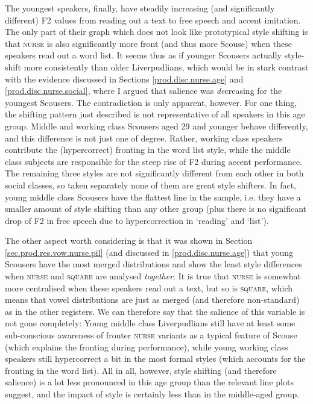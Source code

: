 The youngest speakers, finally, have steadily increasing (and significantly different) F2 values from reading out a text to free speech and accent imitation.
The only part of their graph which does not look like prototypical style shifting is that \textsc{nurse} is also significantly more front (and thus more Scouse) when these speakers read out a word list.
It seems thus as if younger Scousers actually style-shift more consistently than older Liverpudlians, which would be in stark contrast with the evidence discussed in Sections \ref{prod.disc.nurse.age} and \ref{prod.disc.nurse.social}, where I argued that salience was \emph{de}creasing for the youngest Scousers.
The contradiction is only apparent, however.
For one thing, the shifting pattern just described is not representative of all speakers in this age group.
Middle and working class Scousers aged 29 and younger behave differently, and this difference is not just one of degree.
Rather, working class speakers contribute the (hypercorrect) fronting in the word list style, while the middle class subjects are responsible for the steep rise of F2 during accent performance.
The remaining three styles are not significantly different from each other in both social classes, so taken separately none of them are great style shifters.
In fact, young middle class Scousers have the flattest line in the sample, i.e. they have a smaller amount of style shifting than any other group (plus there is no significant drop of F2 in free speech due to hypercorrection in `reading' and `list').

The other aspect worth considering is that it was shown in Section \ref{sec.prod.res.vow.nurse.pil} (and discussed in \ref{prod.disc.nurse.age}) that young Scousers have the most merged distributions and show the least style differences when \textsc{nurse} and \textsc{square} are analysed \emph{together}.
It is true that \textsc{nurse} is somewhat more centralised when these speakers read out a text, but so is \textsc{square}, which means that vowel distributions are just as merged (and therefore non-standard) as in the other registers.
We can therefore say that the salience of this variable is not gone completely:
Young middle class Liverpudlians still have at least some sub-conscious awareness of fronter \textsc{nurse} variants as a typical feature of Scouse (which explains the fronting during performance), while young working class speakers still hypercorrect a bit in the most formal styles (which accounts for the fronting in the word list).
All in all, however, style shifting (and therefore salience) is a lot less pronounced in this age group than the relevant line plots suggest, and the impact of style is certainly less than in the middle-aged group.

